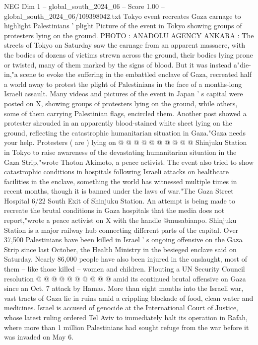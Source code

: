 \begin{textsample}{NEG Dim 1 – global\_south\_2024\_06 – Score 1.00 – global\_south\_2024\_06/109398042.txt}  \label{ex:f1_neg_319}
Tokyo event recreates Gaza carnage to highlight Palestinians ' plight Picture of the event in Tokyo showing groups of protesters lying on the ground.
PHOTO : ANADOLU AGENCY ANKARA : The streets of Tokyo on Saturday saw the carnage from an apparent massacre, with the bodies of dozens of victims strewn across the ground, their bodies lying prone or twisted, many of them marked by the signs of blood.
But it was instead a"die-in,"a scene to evoke the suffering in the embattled enclave of Gaza, recreated half a world away to protest the plight of Palestinians in the face of a months-long Israeli assault.
Many videos and pictures of the event in Japan ' s capital were posted on X, showing groups of protesters lying on the ground, while others, some of them carrying Palestinian flags, encircled them.
Another post showed a protester shrouded in an apparently blood-stained white sheet lying on the ground, reflecting the catastrophic humanitarian situation in Gaza."Gaza needs your help.
Protesters ( are ) lying on @ @ @ @ @ @ @ @ @ @ Shinjuku Station in Tokyo to raise awareness of the devastating humanitarian situation in the Gaza Strip,"wrote Thoton Akimoto, a peace activist.
The event also tried to show catastrophic conditions in hospitals following Israeli attacks on healthcare facilities in the enclave, something the world has witnessed multiple times in recent months, though it is banned under the laws of war."The Gaza Street Hospital 6/22 South Exit of Shinjuku Station.
An attempt is being made to recreate the brutal conditions in Gaza hospitals that the media does not report,"wrote a peace activist on X with the handle @musabianpo.
Shinjuku Station is a major railway hub connecting different parts of the capital.
Over 37,500 Palestinians have been killed in Israel ' s ongoing offensive on the Gaza Strip since last October, the Health Ministry in the besieged enclave said on Saturday.
Nearly 86,000 people have also been injured in the onslaught, most of them -- like those killed -- women and children.
Flouting a UN Security Council resolution @ @ @ @ @ @ @ @ @ @ amid its continued brutal offensive on Gaza since an Oct. 7 attack by Hamas.
More than eight months into the Israeli war, vast tracts of Gaza lie in ruins amid a crippling blockade of food, clean water and medicines.
Israel is accused of genocide at the International Court of Justice, whose latest ruling ordered Tel Aviv to immediately halt its operation in Rafah, where more than 1 million Palestinians had sought refuge from the war before it was invaded on May 6.

\end{textsample}
